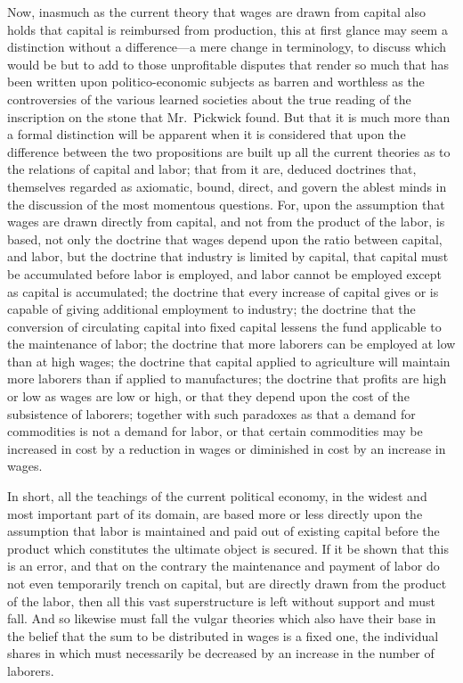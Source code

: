 Now, inasmuch as the current theory that wages are drawn from capital
also holds that capital is reimbursed from production, this at first
glance may seem a distinction without a difference---a mere change in
terminology, to discuss which would be but to add to those unprofitable
disputes that render so much that has been written upon
politico-economic subjects as barren and worthless as the controversies
of the various learned societies about the true reading of the
inscription on the stone that Mr.~Pickwick found. But that it is much
more than a formal distinction will be apparent when it is considered
that upon the difference between the two propositions are built up all
the current theories as to the relations of capital and labor; that from
it are, deduced doctrines that, themselves regarded as axiomatic, bound,
direct, and govern the ablest minds in the discussion of the most
momentous questions. For, upon the assumption that wages are drawn
directly from capital, and not from the product of the labor, is based,
not only the doctrine that wages depend upon the ratio between capital,
and labor, but the doctrine that industry is limited by capital, that
capital must be accumulated before labor is employed, and labor cannot
be employed except as capital is accumulated; the doctrine that every
increase of capital gives or is capable of giving additional employment
to industry; the doctrine that the conversion of circulating capital
into fixed capital lessens the fund applicable to the maintenance of
labor; the doctrine that more laborers can be employed at low than at
high wages; the doctrine that capital applied to agriculture will
maintain more laborers than if applied to manufactures; the doctrine
that profits are high or low as wages are low or high, or that they
depend upon the cost of the subsistence of laborers; together with such
paradoxes as that a demand for commodities is not a demand for labor, or
that certain commodities may be increased in cost by a reduction in
wages or diminished in cost by an increase in wages.

In short, all the teachings of the current political economy, in the
widest and most important part of its domain, are based more or less
directly upon the assumption that labor is maintained and paid out of
existing capital before the product which constitutes the ultimate
object is secured. If it be shown that this is an error, and that on the
contrary the maintenance and payment of labor do not even temporarily
trench on capital, but are directly drawn from the product of the labor,
then all this vast superstructure is left without support and must fall.
And so likewise must fall the vulgar theories which also have their base
in the belief that the sum to be distributed in wages is a fixed one,
the individual shares in which must necessarily be decreased by an
increase in the number of laborers.

